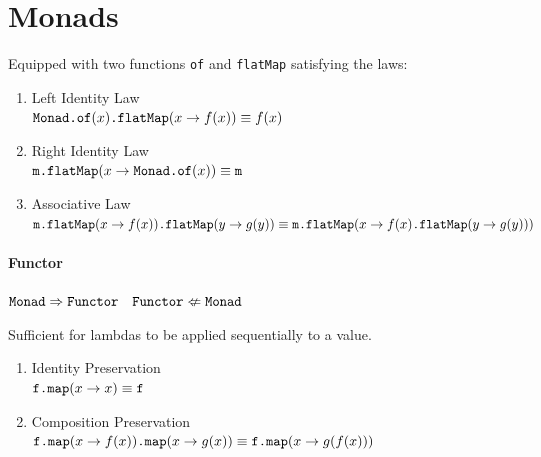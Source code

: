 \section{Monads}
Equipped with two functions \verb|of| and \verb|flatMap| satisfying the laws:
\begin{enumerate}
  \item Left Identity Law\\
    $\verb|Monad.of|(x)\verb|.flatMap|(x\rightarrow f(x))\equiv f(x)$
  \item Right Identity Law\\
    $\verb|m.flatMap|(x\rightarrow\verb|Monad.of|(x))\equiv\verb|m|$
  \item Associative Law\\
    $\verb|m.flatMap|(x\rightarrow f(x))\verb|.flatMap|(y\rightarrow g(y))\equiv\\
     \verb|m.flatMap|(x\rightarrow f(x)\verb|.flatMap|(y\rightarrow g(y)))$
\end{enumerate}
\paragraph{Functor}
\begin{center}
  $\verb|Monad|\Rightarrow\verb|Functor|\quad\verb|Functor|\nLeftarrow\verb|Monad|$
\end{center}
Sufficient for lambdas to be applied sequentially to a value.
\begin{enumerate}
  \item Identity Preservation\\
    $\verb|f.map|(x\rightarrow x)\equiv\verb|f|$
  \item Composition Preservation\\
    $\verb|f.map|(x\rightarrow f(x))\verb|.map|(x\rightarrow g(x))\equiv\\
    \verb|f.map|(x\rightarrow g(f(x)))$
\end{enumerate}
